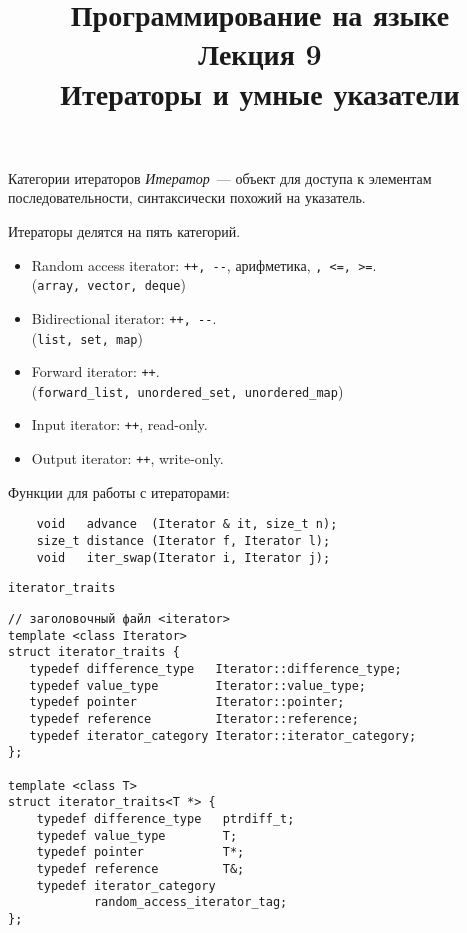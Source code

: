 \documentclass[aspectration=1610,t]{beamer}
\title{{\bf Программирование на языке \langcpp\protect\\Лекция
9\protect\vspace{1em}\\}Итераторы и умные указатели}
\begin{document}
\begin{frame} 
  \titlepage
\end{frame}

\begin{frame}[fragile]{Категории итераторов}
    \emph{Итератор}~— объект для доступа к элементам
    последовательности, синтаксически похожий на указатель.

    Итераторы делятся на пять категорий. 
    \begin{itemize}
        \item Random access iterator: {\tt ++, \verb!--!}, арифметика, {\tt <, >, <=, >=}.\\
        (\texttt{array, vector, deque})

        \item Bidirectional iterator: {\tt ++, \verb!--!}.\\
        (\texttt{list, set, map})

        \item Forward iterator: {\tt ++}.\\
        (\texttt{forward\_list, unordered\_set, unordered\_map})

        \item Input iterator: {\tt ++}, read-only.

        \item Output iterator: {\tt ++}, write-only.
    \end{itemize}

    Функции для работы с итераторами:
\begin{lstlisting}
    void   advance  (Iterator & it, size_t n);
    size_t distance (Iterator f, Iterator l);
    void   iter_swap(Iterator i, Iterator j);
\end{lstlisting}
\end{frame}

\begin{frame}[fragile]{{\tt iterator\_traits}}
\begin{lstlisting}
// заголовочный файл <iterator>
template <class Iterator>
struct iterator_traits {
   typedef difference_type   Iterator::difference_type;
   typedef value_type        Iterator::value_type;
   typedef pointer           Iterator::pointer;
   typedef reference         Iterator::reference;
   typedef iterator_category Iterator::iterator_category;
};

template <class T>
struct iterator_traits<T *> {
    typedef difference_type   ptrdiff_t;
    typedef value_type        T;
    typedef pointer           T*;
    typedef reference         T&;
    typedef iterator_category 
            random_access_iterator_tag;
};
\end{lstlisting}
\end{frame}
 
\end{document}
